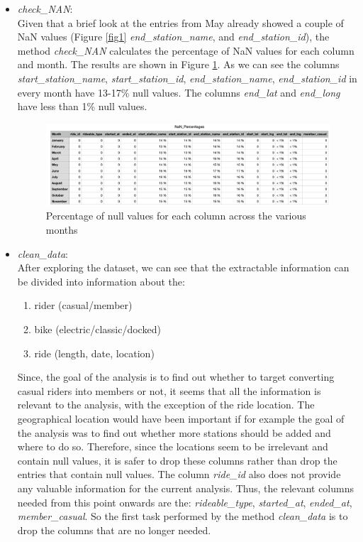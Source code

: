 \documentclass[12pt]{article}
\begin{document}
\begin{itemize}
	\item \textit{check\_NAN}:\\
	Given that a brief look at the entries from May already showed a couple of NaN values (Figure \ref{fig1} \textit{end\_station\_name}, and \textit{end\_station\_id}), the method \textit{check\_NAN} calculates the percentage of NaN values for each column and month. The results are shown in Figure \ref{fig4}. As we can see the columns \textit{start\_station\_name}, \textit{start\_station\_id}, \textit{end\_station\_name}, \textit{end\_station\_id} in every month have 13-17\% null values. The columns \textit{end\_lat} and \textit{end\_long} have less than 1\% null values. 
	
	\begin{figure}[h]
	\includegraphics[width=6.5 in, height = 2.3 in]{imgNAN.png}
	\caption{Percentage of null values for each column across the various months}
	\label{fig4}
	\end{figure}
	
	\item \textit{clean\_data}:\\
	After exploring the dataset, we can see that the extractable information can be divided into information about the:
	\begin{enumerate} 
	\item rider (casual/member)
	\item bike (electric/classic/docked)
	\item ride (length, date, location)
	\end{enumerate}
Since, the goal of the analysis is to find out whether to target converting casual riders into members or not, it seems that all the information is relevant to the analysis, with the exception of the ride location. The geographical location would have been important if for example the goal of the analysis was to find out whether more stations should be added and where to do so. Therefore, since the locations seem to be irrelevant and contain null values, it is safer to drop these columns rather than drop the entries that contain null values. The column \textit{ride\_id} also does not provide any valuable information for the current analysis. Thus, the relevant columns needed from this point onwards are the: \textit{rideable\_type}, \textit{started\_at}, \textit{ended\_at}, \textit{member\_casual}. So the first task performed by the method \textit{clean\_data} is to drop the columns that are no longer needed. 



\end{itemize}
\end{document}
